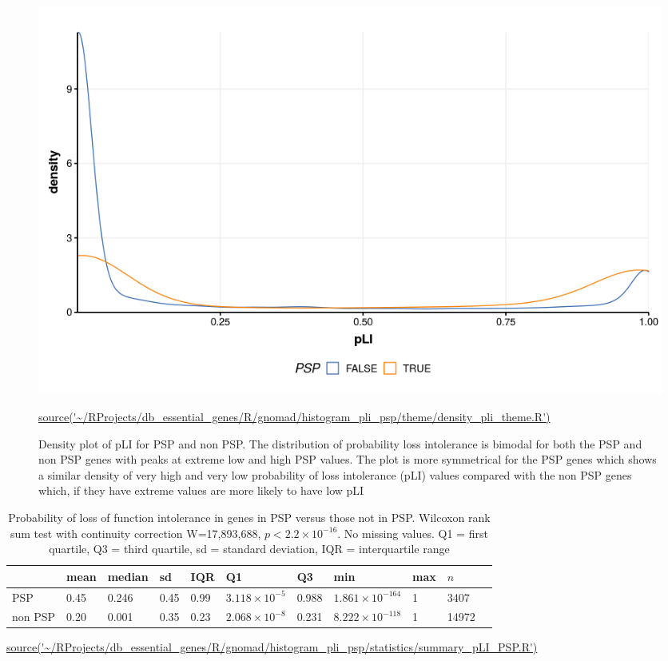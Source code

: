 \begin{figure}
    \centering
    \includegraphics[width=\textwidth]{images/chapter3/ggplot2/gnomad/theme/Rplot_density_Mar_gnomad_theme.png}
    \caption[Density plot pLI for PSP and non PSP genes]{Density plot of pLI for PSP and non PSP. The distribution of probability loss intolerance is bimodal for both the PSP and non PSP genes with peaks at extreme low and high PSP values. The plot is more symmetrical for the PSP genes which shows a similar density of very high and very low probability of loss intolerance (pLI) values compared with the non PSP genes which, if they have extreme values are more likely to have low pLI}
    \tiny\url{source('~/RProjects/db_essential_genes/R/gnomad/histogram_pli_psp/theme/density_pli_theme.R')}
    
    \label{fig:densityPLI_theme}
\end{figure}






\begin{table}[ht]
\centering
\setlength{\extrarowheight}{2pt}
\begin{adjustbox}{width=\textwidth}
\begin{tabular}{lllllllllll}
  \toprule
 & mean & median & sd & IQR & Q1 & Q3 & min & max & $n$ \\ 
  \midrule
PSP & 0.45 & 0.246 & 0.45 & 0.99 & $3.118 \times 10^{-5}$ & 0.988 & $1.861 \times 10^{-164}$ & 1 & 3407  \\ 
  non PSP & 0.20 & 0.001 & 0.35 & 0.23 & $2.068 \times 10^{-8}$ & 0.231 & $8.222 \times 10^{-118}$ & 1 & 14972 \\ 
   \bottomrule
\end{tabular}
\end{adjustbox}
\caption[Summary statistics PSP versus non PSP genes pLI]{Probability of loss of function intolerance in genes in PSP versus those not in PSP. Wilcoxon rank sum test with continuity correction W=17,893,688,  $p<2.2\times10^{-16}$. No missing values. Q1 = first quartile, Q3 = third quartile, sd = standard deviation, IQR = interquartile range} 
\tiny\url{source('~/RProjects/db_essential_genes/R/gnomad/histogram_pli_psp/statistics/summary_pLI_PSP.R')}
\label{tab:Probability of loss of function intolerance in genes in PSP versus those not in PSP}
\end{table}



